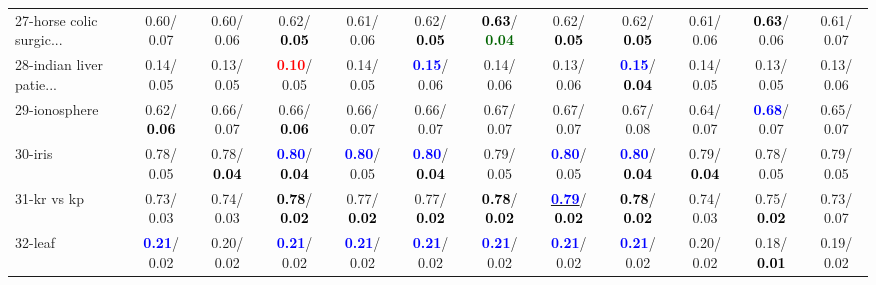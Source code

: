 \begin{table}[h]
\begin{center}
{\begin{tabular}{lc|c|c|c|c|c|c|c|c|c|c}
27-horse colic surgic... &   0.60/  0.07 &   0.60/  0.06 &   0.62/\textcolor{black}{\textbf{  0.05}} &   0.61/  0.06 &   0.62/\textcolor{black}{\textbf{  0.05}} & \textcolor{black}{\textbf{  0.63}}/\textcolor{darkgreen}{\textbf{  0.04}} &   0.62/\textcolor{black}{\textbf{  0.05}} &   0.62/\textcolor{black}{\textbf{  0.05}} &   0.61/  0.06 & \textcolor{black}{\textbf{  0.63}}/  0.06 &   0.61/  0.07 \\
28-indian liver patie... &   0.14/  0.05 &   0.13/  0.05 & \textcolor{red}{\textbf{  0.10}}/  0.05 &   0.14/  0.05 & \textcolor{blue}{\textbf{  0.15}}/  0.06 &   0.14/  0.06 &   0.13/  0.06 & \textcolor{blue}{\textbf{  0.15}}/\textcolor{black}{\textbf{  0.04}} &   0.14/  0.05 &   0.13/  0.05 &   0.13/  0.06 \\ \hline
29-ionosphere &   0.62/\textcolor{black}{\textbf{  0.06}} &   0.66/  0.07 &   0.66/\textcolor{black}{\textbf{  0.06}} &   0.66/  0.07 &   0.66/  0.07 &   0.67/  0.07 &   0.67/  0.07 &   0.67/  0.08 &   0.64/  0.07 & \textcolor{blue}{\textbf{  0.68}}/  0.07 &   0.65/  0.07 \\
30-iris &   0.78/  0.05 &   0.78/\textcolor{black}{\textbf{  0.04}} & \textcolor{blue}{\textbf{  0.80}}/\textcolor{black}{\textbf{  0.04}} & \textcolor{blue}{\textbf{  0.80}}/  0.05 & \textcolor{blue}{\textbf{  0.80}}/\textcolor{black}{\textbf{  0.04}} &   0.79/  0.05 & \textcolor{blue}{\textbf{  0.80}}/  0.05 & \textcolor{blue}{\textbf{  0.80}}/\textcolor{black}{\textbf{  0.04}} &   0.79/\textcolor{black}{\textbf{  0.04}} &   0.78/  0.05 &   0.79/  0.05 \\
31-kr vs kp &   0.73/  0.03 &   0.74/  0.03 & \textcolor{black}{\textbf{  0.78}}/\textcolor{black}{\textbf{  0.02}} &   0.77/\textcolor{black}{\textbf{  0.02}} &   0.77/\textcolor{black}{\textbf{  0.02}} & \textcolor{black}{\textbf{  0.78}}/\textcolor{black}{\textbf{  0.02}} & \underline{\textcolor{blue}{\textbf{  0.79}}}/\textcolor{black}{\textbf{  0.02}} & \textcolor{black}{\textbf{  0.78}}/\textcolor{black}{\textbf{  0.02}} &   0.74/  0.03 &   0.75/\textcolor{black}{\textbf{  0.02}} &   0.73/  0.07 \\
32-leaf & \textcolor{blue}{\textbf{  0.21}}/  0.02 &   0.20/  0.02 & \textcolor{blue}{\textbf{  0.21}}/  0.02 & \textcolor{blue}{\textbf{  0.21}}/  0.02 & \textcolor{blue}{\textbf{  0.21}}/  0.02 & \textcolor{blue}{\textbf{  0.21}}/  0.02 & \textcolor{blue}{\textbf{  0.21}}/  0.02 & \textcolor{blue}{\textbf{  0.21}}/  0.02 &   0.20/  0.02 &   0.18/\textcolor{black}{\textbf{  0.01}} &   0.19/  0.02 \\\end{tabular}
}\label{strats0aC4.5w}
\end{center}
\end{table}
